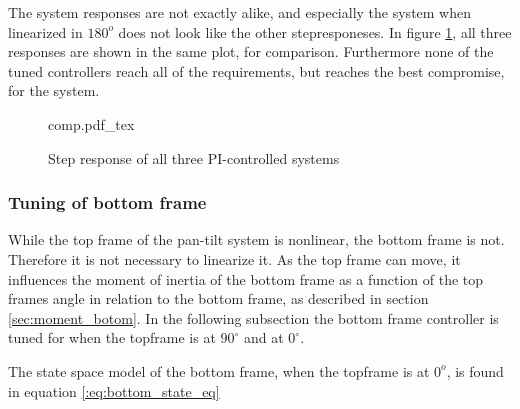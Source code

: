 \documentclass[../../../Main]{subfiles}
\begin{document}
The system responses are not exactly alike, and especially the system when linearized in $180^o$ does not look like the other stepresponeses. In figure \ref{fig:comp}, all three responses are shown in the same plot, for comparison. Furthermore none of the tuned controllers reach all of the requirements, but reaches the best compromise, for the system.

\begin{figure}[H]
\centering
\def\svgwidth{\textwidth}
{comp.pdf_tex}
\caption{Step response of all three PI-controlled systems}
\label{fig:comp}
\end{figure}

\subsubsection{Tuning of bottom frame}

While the top frame of the pan-tilt system is nonlinear, the bottom frame is not. Therefore it is not necessary to linearize it. As the top frame can move, it influences the moment of inertia of the bottom frame as a function of the top frames angle in relation to the bottom frame, as described in section \ref{sec:moment_botom}.
In the following subsection the bottom frame controller is tuned for when the topframe is at $90^\circ$ and at $0^\circ$.

The state space model of the bottom frame, when the topframe is at $0^o$, is found in equation \eqref{:eq:bottom_state_eq}
\end{document}

